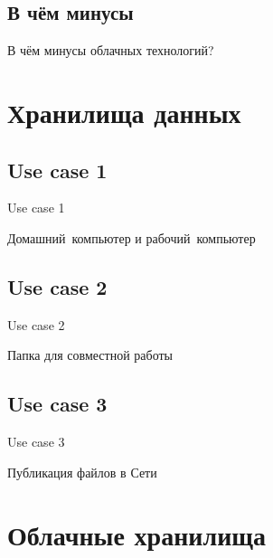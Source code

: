 \documentclass[compress,red]{beamer}
\begin{document}
\subsection{В чём минусы}
\begin{frame}
  \begin{center}
    \Huge{В чём минусы облачных технологий?}
  \end{center}
\end{frame}


\section{Хранилища данных}
\subsection{Use case 1}
\begin{frame}
  \begin{center}
    \Huge{Use case 1}
  \end{center}
  \begin{center}
    \Large{Домашний~компьютер и рабочий~компьютер}
  \end{center}
\end{frame}

\subsection{Use case 2}
\begin{frame}
  \begin{center}
    \Huge{Use case 2}
  \end{center}
  \begin{center}
    \Large{Папка для совместной работы}
  \end{center}
\end{frame}

\subsection{Use case 3}
\begin{frame}
  \begin{center}
    \Huge{Use case 3}
  \end{center}
  \begin{center}
    \Large{Публикация файлов в Сети}
  \end{center}
\end{frame}

\section{Облачные хранилища}
\end{document}
